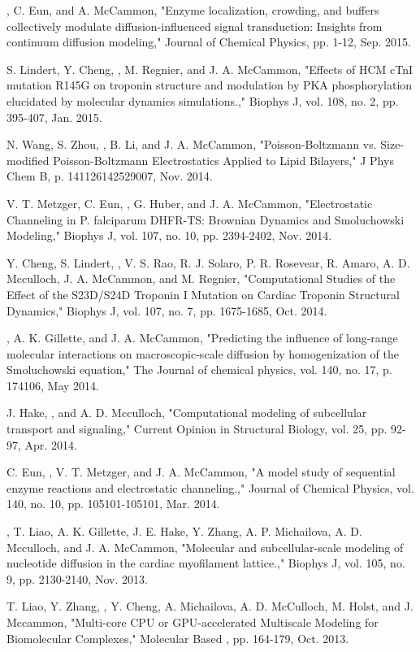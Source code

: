 \documentclass{res} %
\begin{document}
\begin{resume}
\begin{etaremune}
\item \pmkh, C. Eun, and A. McCammon, "Enzyme localization, crowding, and buffers collectively modulate diffusion-influenced signal transduction: Insights from continuum diffusion modeling," Journal of Chemical Physics, pp. 1-12, Sep. 2015.
\item S. Lindert, Y. Cheng, \pmkh, M. Regnier, and J. A. McCammon, "Effects of HCM cTnI mutation R145G on troponin structure and modulation by PKA phosphorylation elucidated by molecular dynamics simulations.," Biophys J, vol. 108, no. 2, pp. 395-407, Jan. 2015.
\item N. Wang, S. Zhou, \pmkh, B. Li, and J. A. McCammon, "Poisson-Boltzmann vs. Size-modified Poisson-Boltzmann Electrostatics Applied to Lipid Bilayers," J Phys Chem B, p. 141126142529007, Nov. 2014.
\item V. T. Metzger, C. Eun, \pmkh, G. Huber, and J. A. McCammon, "Electrostatic Channeling in P. falciparum DHFR-TS: Brownian Dynamics and Smoluchowski Modeling," Biophys J, vol. 107, no. 10, pp. 2394-2402, Nov. 2014.
\item Y. Cheng, S. Lindert, \pmkh, V. S. Rao, R. J. Solaro, P. R. Rosevear, R. Amaro, A. D. Mcculloch, J. A. McCammon, and M. Regnier, "Computational Studies of the Effect of the S23D/S24D Troponin I Mutation on Cardiac Troponin Structural Dynamics," Biophys J, vol. 107, no. 7, pp. 1675-1685, Oct. 2014.
\item \pmkh, A. K. Gillette, and J. A. McCammon, "Predicting the influence of long-range molecular interactions on macroscopic-scale diffusion by homogenization of the Smoluchowski equation," The Journal of chemical physics, vol. 140, no. 17, p. 174106, May 2014.
\item J. Hake, \pmkh, and A. D. Mcculloch, "Computational modeling of subcellular transport and signaling," Current Opinion in Structural Biology, vol. 25, pp. 92-97, Apr. 2014.
\item C. Eun, \pmkh*, V. T. Metzger, and J. A. McCammon, "A model study of sequential enzyme reactions and electrostatic channeling.," Journal of Chemical Physics, vol. 140, no. 10, pp. 105101-105101, Mar. 2014.
\item \pmkh, T. Liao, A. K. Gillette, J. E. Hake, Y. Zhang, A. P. Michailova, A. D. Mcculloch, and J. A. McCammon, "Molecular and subcellular-scale modeling of nucleotide diffusion in the cardiac myofilament lattice.," Biophys J, vol. 105, no. 9, pp. 2130-2140, Nov. 2013.
\item T. Liao, Y. Zhang, \pmkh, Y. Cheng, A. Michailova, A. D. McCulloch, M. Holst, and J. Mccammon, "Multi-core CPU or GPU-accelerated Multiscale Modeling for Biomolecular Complexes," Molecular Based , pp. 164-179, Oct. 2013.

\end{etaremune}
\end{resume}
\end{document}
